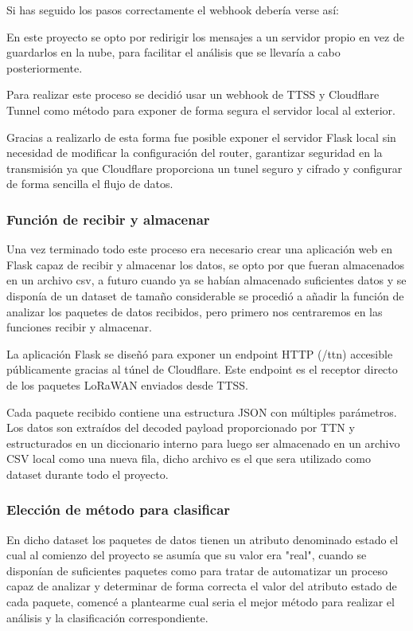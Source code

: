 Si has seguido los pasos correctamente  el webhook debería verse así:



En este proyecto se opto por redirigir los mensajes a un servidor propio en vez de guardarlos en la nube, para facilitar el análisis que se llevaría a cabo posteriormente.

Para realizar este proceso se decidió usar un webhook de TTSS y Cloudflare Tunnel como método para exponer de forma segura el servidor local al exterior.

Gracias a realizarlo de esta forma fue posible exponer el servidor Flask local sin necesidad de modificar la configuración del router, garantizar seguridad en la transmisión ya que Cloudflare proporciona un tunel seguro y cifrado y configurar de forma sencilla el flujo de datos. 

\subsubsection{Función de recibir y almacenar}

Una vez terminado todo este proceso era necesario crear una aplicación web en Flask capaz de recibir y almacenar los datos, se opto por que fueran almacenados en un archivo csv, a futuro cuando ya se habían almacenado suficientes datos y se disponía de un dataset de tamaño considerable se procedió a añadir la función de analizar los paquetes de datos recibidos, pero primero nos centraremos en las funciones recibir y almacenar.

La aplicación Flask se diseñó para exponer un endpoint HTTP (/ttn) accesible públicamente gracias al túnel de Cloudflare. Este endpoint es el receptor directo de los paquetes LoRaWAN enviados desde TTSS.

Cada paquete recibido contiene una estructura JSON con múltiples parámetros. Los datos son extraídos del decoded payload proporcionado por TTN y estructurados en un diccionario interno para luego ser almacenado en un archivo CSV local como una nueva fila, dicho archivo es el que sera utilizado como dataset durante todo el proyecto.

\subsubsection{Elección de método para clasificar}

En dicho dataset los paquetes de datos tienen un atributo denominado estado el cual al comienzo del proyecto se asumía que su valor era "real", cuando se disponían de suficientes paquetes como para tratar de automatizar un proceso capaz de analizar y determinar de forma correcta el valor del atributo estado de cada paquete, comencé a plantearme cual seria el mejor método para realizar el análisis y la clasificación correspondiente.

